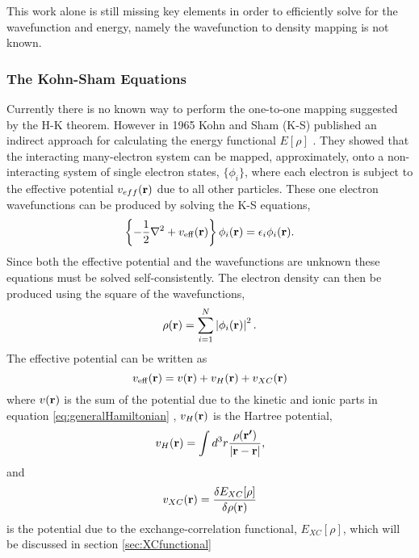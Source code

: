 This work alone is still missing key elements in order to efficiently solve for the wavefunction and energy, namely the wavefunction to density mapping is not known.

\subsubsection{The Kohn-Sham Equations}
Currently there is no known way to perform the one-to-one mapping suggested by the H-K theorem. However in 1965 Kohn and Sham (K-S) published an indirect approach for calculating the energy functional $E[\rho]$ \cite{kohn1965}.
They showed that the interacting many-electron system can be mapped, approximately, onto a non-interacting system of single electron states, $\{\phi_i\}$, where each electron is subject to the effective potential $v_{eff}({\mathrm{\mathbf{\bm{r}}}})$ due to all other particles. These one electron wavefunctions can be produced by solving the K-S equations,
\begin{equation}
\label{eq:K-Sequation}
 \left\{-\frac{1}{2} \nabla ^2 + v_\mathrm{eff}({\mathrm{\mathbf{\bm{r}}}}) \right\} \phi_i({\mathrm{\mathbf{\bm{r}}}}) = \epsilon_i \phi_i({\mathrm{\mathbf{\bm{r}}}}).
\end{equation}
Since both the effective potential and the wavefunctions are unknown these equations must be solved self-consistently.
The electron density can then be produced using the square of the wavefunctions,
\begin{equation}
\label{eq:electronDensity}
 \rho({\mathrm{\mathbf{\bm{r}}}}) = \sum_{i=1}^N \left| \phi_i({\mathrm{\mathbf{\bm{r}}}}) \right|^2.
\end{equation}
The effective potential can be written as
\begin{equation}
\label{eq:effectivePotential}
 v_\mathrm{eff}({\mathrm{\mathbf{\bm{r}}}}) = v({\mathrm{\mathbf{\bm{r}}}}) + v_{H}({\mathrm{\mathbf{\bm{r}}}}) + v_{XC}({\mathrm{\mathbf{\bm{r}}}})
\end{equation}
where $v({\mathrm{\mathbf{\bm{r}}}})$ is the sum of the potential due to the kinetic and ionic parts in equation \ref{eq:generalHamiltonian}%
, $v_{H}({\mathrm{\mathbf{\bm{r}}}})$ is the Hartree potential,
\begin{equation}
\label{eq:hartreePotential}
 v_{H}({\mathrm{\mathbf{\bm{r}}}}) = \int d^3r \frac{\rho({\mathrm{\mathbf{\bm{r'}}}})}{\left| {\mathrm{\mathbf{\bm{r}}}} - {\mathrm{\mathbf{\bm{r}}}} \right|},
\end{equation}
and
\begin{equation}
\label{eq:XCpotential}
 v_{XC}({\mathrm{\mathbf{\bm{r}}}}) = \frac{\delta E_{XC}[\rho]}{\delta \rho({\mathrm{\mathbf{\bm{r}}}})}
\end{equation}
is the potential due to the exchange-correlation functional, $E_{XC}[\rho]$, which will be discussed in section \ref{sec:XCfunctional} 

